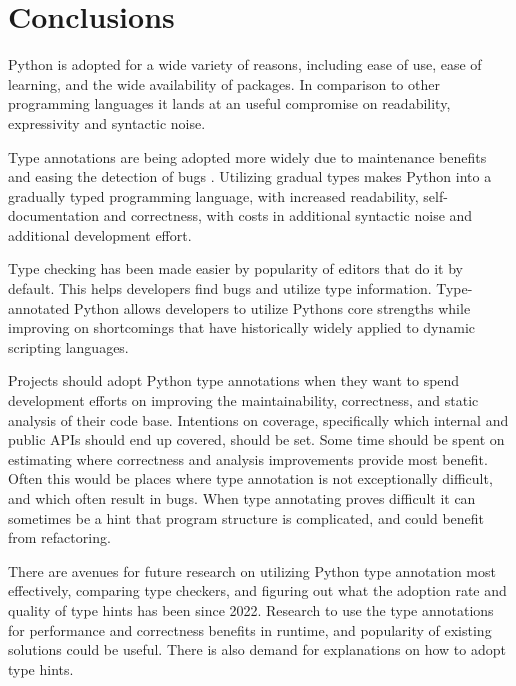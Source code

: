 \chapter{Conclusions\label{conclusions}}

Python is adopted for a wide variety of reasons, including ease of use, ease of learning, and the wide availability of packages. In comparison to other programming languages it lands at an useful compromise on readability, expressivity and syntactic noise.

Type annotations are being adopted more widely due to maintenance benefits and easing the detection of bugs \cite{jin_where_to_start_2021, khan_empirical_2022}. Utilizing gradual types makes Python into a gradually typed programming language, with increased readability, self-documentation and correctness, with costs in additional syntactic noise and additional development effort.  

Type checking has been made easier by popularity of editors that do it by default. This helps developers find bugs and utilize type information. Type-annotated Python allows developers to utilize Pythons core strengths while improving on shortcomings that have historically widely applied to dynamic scripting languages.

Projects should adopt Python type annotations when they want to spend development efforts on improving the maintainability, correctness, and static analysis of their code base. Intentions on coverage, specifically which internal and public APIs should end up covered, should be set. Some time should be spent on estimating where correctness and analysis improvements provide most benefit. Often this would be places where type annotation is not exceptionally difficult, and which often result in bugs. When type annotating proves difficult it can sometimes be a hint that program structure is complicated, and could benefit from refactoring.

There are avenues for future research on utilizing Python type annotation most effectively, comparing type checkers, and figuring out what the adoption rate and quality of type hints has been since 2022. Research to use the type annotations for performance and correctness benefits in runtime, and popularity of existing solutions could be useful. There is also demand for explanations on how to adopt type hints.

